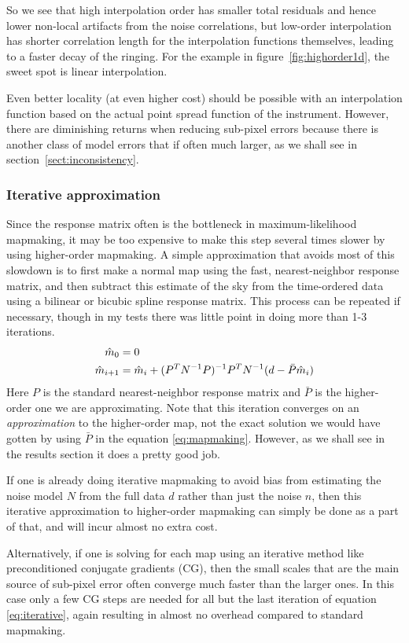 \documentclass{article}
\begin{document}
So we see that high interpolation order has smaller total residuals and hence lower
non-local artifacts from the noise correlations, but low-order interpolation has shorter
correlation length for the interpolation functions themselves, leading to a faster decay of
the ringing. For the example in figure~\ref{fig:highorder1d}, the sweet spot is linear interpolation.

Even better locality (at even higher cost) should be possible with an interpolation
function based on the actual point spread function of the instrument.
However, there are diminishing returns when reducing sub-pixel errors because there is another
class of model errors that if often much larger, as we shall see in section~\ref{sect:inconsistency}.

\subsubsection{Iterative approximation}
Since the response matrix often is the bottleneck in maximum-likelihood mapmaking,
it may be too expensive to make this step several times slower by using higher-order
mapmaking. A simple approximation that avoids most of this slowdown is to first make
a normal map using the fast, nearest-neighbor response matrix, and then subtract this
estimate of the sky from the time-ordered data using a bilinear or bicubic spline
response matrix. This process can be repeated if necessary, though in my tests there
was little point in doing more than 1-3 iterations.
\begin{align}
\hat m_0 &= 0 \notag \\
\hat m_{i+1} &= \hat m_i + (P^TN^{-1}P)^{-1}P^TN^{-1}(d - \bar P \hat m_i) \label{eq:iterative}
\end{align}
Here $P$ is the standard nearest-neighbor response matrix and $\bar P$ is
the higher-order one we are approximating. Note that this iteration converges
on an \emph{approximation} to the higher-order map, not the exact solution
we would have gotten by using $\bar P$ in the equation \ref{eq:mapmaking}.
However, as we shall see in the results section it does a pretty good job.

If one is already doing iterative mapmaking to avoid bias from
estimating the noise model $N$ from the full data $d$ rather than
just the noise $n$, then this iterative approximation to higher-order mapmaking
can simply be done as a part of that, and will incur almost no extra cost.

Alternatively, if one is solving for each map using an iterative method
like preconditioned conjugate gradients (CG), then the small scales that are the
main source of sub-pixel error often converge much faster than the larger ones.
In this case only a few CG steps are needed for all but the last iteration
of equation \ref{eq:iterative}, again resulting in almost no overhead compared to
standard mapmaking.
\end{document}
